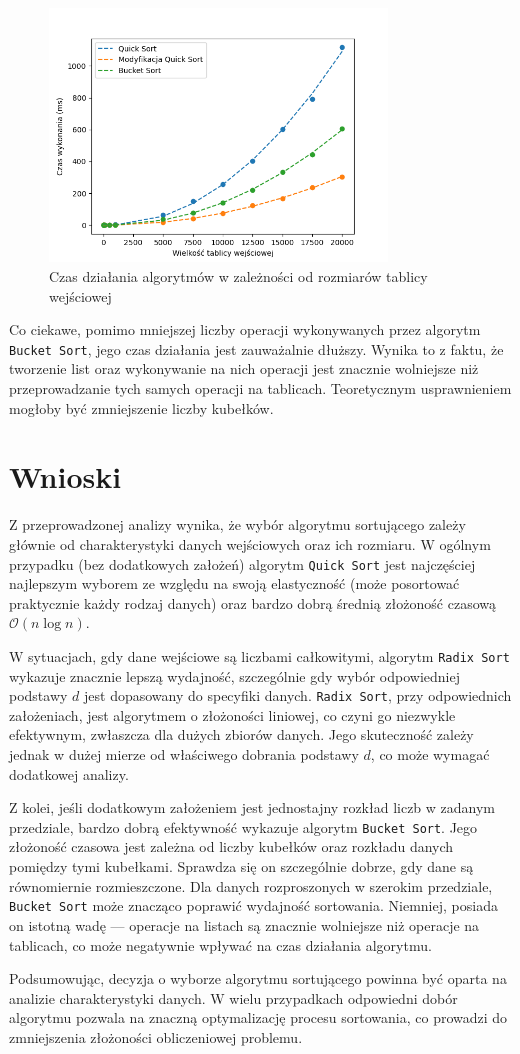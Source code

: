 \documentclass{article}
\newcommand{\bigO}{\mathcal{O}}
\begin{document}
\begin{figure}[H]
    \centering
    \includegraphics[width=0.8\textwidth]{Figure_10.png}
    \caption{Czas działania algorytmów w zależności od rozmiarów tablicy wejściowej}
    \label{fig:buckett}
\end{figure}
Co ciekawe, pomimo mniejszej liczby operacji wykonywanych przez algorytm \texttt{Bucket Sort}, jego czas działania jest zauważalnie dłuższy. Wynika to z faktu, że tworzenie list oraz wykonywanie na nich operacji jest znacznie wolniejsze niż przeprowadzanie tych samych operacji na tablicach. Teoretycznym usprawnieniem mogłoby być zmniejszenie liczby kubełków.
\section{Wnioski}
Z przeprowadzonej analizy wynika, że wybór algorytmu sortującego zależy głównie od charakterystyki danych wejściowych oraz ich rozmiaru. W ogólnym przypadku (bez dodatkowych założeń) algorytm \texttt{Quick Sort} jest najczęściej najlepszym wyborem ze względu na swoją elastyczność (może posortować praktycznie każdy rodzaj danych) oraz bardzo dobrą średnią złożoność czasową $\bigO(n \log n)$. 

W sytuacjach, gdy dane wejściowe są liczbami całkowitymi, algorytm \texttt{Radix Sort} wykazuje znacznie lepszą wydajność, szczególnie gdy wybór odpowiedniej podstawy $d$ jest dopasowany do specyfiki danych. \texttt{Radix Sort}, przy odpowiednich założeniach, jest algorytmem o złożoności liniowej, co czyni go niezwykle efektywnym, zwłaszcza dla dużych zbiorów danych. Jego skuteczność zależy jednak w dużej mierze od właściwego dobrania podstawy $d$, co może wymagać dodatkowej analizy.

Z kolei, jeśli dodatkowym założeniem jest jednostajny rozkład liczb w zadanym przedziale, bardzo dobrą efektywność wykazuje algorytm \texttt{Bucket Sort}. Jego złożoność czasowa jest zależna od liczby kubełków oraz rozkładu danych pomiędzy tymi kubełkami. Sprawdza się on szczególnie dobrze, gdy dane są równomiernie rozmieszczone. Dla danych rozproszonych w szerokim przedziale, \texttt{Bucket Sort} może znacząco poprawić wydajność sortowania. Niemniej, posiada on istotną wadę — operacje na listach są znacznie wolniejsze niż operacje na tablicach, co może negatywnie wpływać na czas działania algorytmu.

Podsumowując, decyzja o wyborze algorytmu sortującego powinna być oparta na analizie charakterystyki danych. W wielu przypadkach odpowiedni dobór algorytmu pozwala na znaczną optymalizację procesu sortowania, co prowadzi do zmniejszenia złożoności obliczeniowej problemu.
\end{document}
